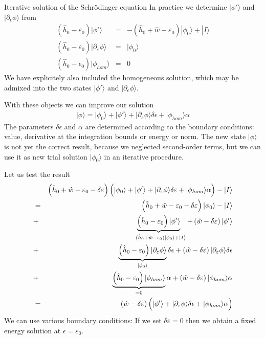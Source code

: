 \documentclass[11pt,a4paper]{report}
\begin{document}
\begin{myshadowminipage}{Iterative solution of the Schr\"odinger equation}
In practice we determine $|\phi'\rangle$ and $|\partial_\epsilon
\phi\rangle$ from
\begin{eqnarray*}
\left(\hat{h}_0-\varepsilon_0\right)
|\phi\prime\rangle
&=&-\left(\hat{h}_0+\hat{w}-\varepsilon_0\right)
|\phi_0\rangle
+|I\rangle
\\
\left(\hat{h}_0-\varepsilon_0\right)
|\partial_\varepsilon\phi\rangle
&=&|\phi_0\rangle
\\
(\hat{h}_0-\epsilon_0)|\phi_{hom}\rangle&=&0
\end{eqnarray*}
We have explicitely also included the homogeneous solution, which may
be admixed into the two states $|\phi'\rangle$ and
$|\partial_\epsilon\phi\rangle$.

With these objects we can improve our solution
\begin{eqnarray*}
|\phi\rangle=|\phi_0\rangle+|\phi'\rangle
+|\partial_\varepsilon\phi\rangle\delta\epsilon+|\phi_{hom}\rangle \alpha
\end{eqnarray*}
The parameters $\delta\epsilon$ and $\alpha$ are determined according
to the boundary conditions: value, derivative at the integration
bounds or energy or norm.
The new state $|\phi\rangle$ is not yet the correct result, because we
neglected second-order terms, but we can use it as new trial solution
$|\phi_0\rangle$ in an iterative procedure.
\end{myshadowminipage}

Let us test the result
\begin{eqnarray*}
&&\left(\hat{h}_0+\hat{w}-\varepsilon_0-\delta\varepsilon\right)
\Bigl(|\phi_0\rangle+|\phi'\rangle
+|\partial_\varepsilon\phi\rangle\delta\varepsilon
+|\phi_{hom}\rangle\alpha\Bigr)-|I\rangle
\\
&=&\left(\hat{h}_0+\hat{w}-\varepsilon_0-\delta\varepsilon\right)|\phi_0\rangle
-|I\rangle
\\
&+&
\underbrace{\left(\hat{h}_0-\varepsilon_0\right)|\phi'\rangle}
_{-(\hat{h}_0+\hat{w}-\epsilon_0)|\phi_0\rangle+|I\rangle}
+\left(\hat{w}-\delta\varepsilon\right)|\phi'\rangle
\\
&+&
\underbrace{\left(\hat{h}_0-\varepsilon_0\right)
|\partial_\varepsilon\phi\rangle}_{|\phi_0\rangle}\delta\epsilon
+\left(\hat{w}-\delta\varepsilon\right)
|\partial_\varepsilon\phi\rangle\delta\epsilon
\\
&+&
\underbrace{\left(\hat{h}_0-\varepsilon_0\right)
|\phi_{hom}\rangle}_{=0}\alpha
+\left(\hat{w}-\delta\varepsilon\right)
|\phi_{hom}\rangle\alpha
\\
&=&
\left(\hat{w}-\delta\varepsilon\right)
\Bigl(|\phi'\rangle
+|\partial_\varepsilon\phi\rangle\delta\epsilon
+|\phi_{hom}\rangle\alpha\Bigr)
\end{eqnarray*}
We can use various boundary conditions: If we set
$\delta\varepsilon=0$ then we obtain a fixed energy solution at
$\epsilon=\varepsilon_0$. 
\end{document}
